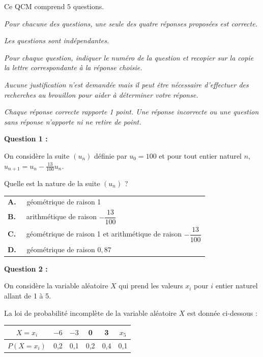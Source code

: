 \medskip

Ce QCM comprend $5$ questions.

\emph{Pour chacune des questions, une seule des quatre réponses proposées est correcte.}

\emph{Les questions sont indépendantes.}

\emph{Pour chaque question, indiquer le numéro de la question et recopier sur la copie la lettre correspondante à la réponse choisie.}

\emph{Aucune justification n’est demandée mais il peut être nécessaire d’effectuer des recherches au brouillon pour aider à déterminer votre réponse.}

\emph{Chaque réponse correcte rapporte 1 point. Une réponse incorrecte ou une question sans réponse n’apporte ni ne retire de point.}

\medskip
 \textbf{Question 1 :}
\medskip

 On considère la suite $\left(u_n\right)$ définie par $u_0=  100$ et pour tout entier naturel $n$, $u_{n+1}=u_n-\frac{13}{100}u_n$. 

Quelle est la nature de la suite $\left(u_n\right)$ ?


\begin{tabularx}{\linewidth}{*{1}{X}}
\textbf{A.~~} géométrique de raison 1\\
\textbf{B.~~} arithmétique de raison $-\dfrac{13}{100}$\\
\textbf{C.~~} géométrique de raison 1 et arithmétique de raison $-\dfrac{13}{100}$\\
\textbf{D.~~} géométrique de raison $0,87$\\
\end{tabularx}

\medskip
 \textbf{Question 2 :}
\medskip

On considère la variable aléatoire $X$ qui prend les valeurs $x_i$ pour $i$ entier naturel allant de 1 à 5.

La loi de probabilité incomplète de la variable aléatoire $X$ est donnée ci-dessous :

\begin{center}
\begin{tabular}[]{|*{6}{c|}}
\hline
$X = x_i$				&$- 6$	&$- 3$	&0	&3	&$x_5$\\\hline
$P\left(X = x_i\right)$	&0,2	&0,1	&0,2&0,4&0,1\\\hline
\end{tabular}
\end{center}

